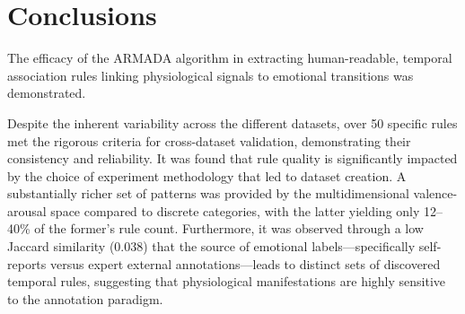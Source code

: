 \documentclass{isd}
\begin{document}
{%

\section{Conclusions}
\label{sec:conclusions}

The efficacy of the ARMADA algorithm in extracting human-readable, temporal association rules linking physiological signals to emotional transitions was demonstrated.

Despite the inherent variability across the different datasets, over 50 specific rules met the rigorous criteria for cross-dataset validation, demonstrating their consistency and reliability. It was found that rule quality is significantly impacted by the choice of experiment methodology that led to dataset creation. A substantially richer set of patterns was provided by the multidimensional valence-arousal space compared to discrete categories, with the latter yielding only 12–40\% of the former's rule count. Furthermore, it was observed through a low Jaccard similarity (0.038) that the source of emotional labels—specifically self-reports versus expert external annotations—leads to distinct sets of discovered temporal rules, suggesting that physiological manifestations are highly sensitive to the annotation paradigm.

}
\end{document}

